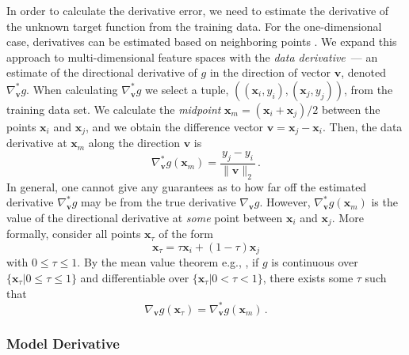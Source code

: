 \documentclass[conference]{IEEEtran}
\begin{document}
In order to calculate the derivative error, we need to estimate the derivative of the unknown target function from the training data. 
For the one-dimensional case, derivatives can be estimated based on neighboring points \cite{kis2021numerical}.
We expand this approach to multi-dimensional feature spaces with the \emph{data derivative}~--- an estimate of the directional derivative of $g$ in the direction of vector $\mathbf{v}$, denoted $\nabla^{*}_{\mathbf{v}}g$. 
When calculating $\nabla^{*}_{\mathbf{v}}g$ we select a tuple, $((\mathbf{x}_i,y_i),(\mathbf{x}_j,y_j))$, from the training data set.
We calculate the \emph{midpoint} $\mathbf{x}_m = (\mathbf{x}_i+\mathbf{x}_j)/2$ between the points $\mathbf{x}_i$ and $\mathbf{x}_j$, and we obtain the difference vector $\mathbf{v} = \mathbf{x}_j - \mathbf{x}_i$.
Then, the data derivative at $\mathbf{x}_m$ along the direction $\mathbf{v}$ is
\begin{equation} 
\nabla^{*}_{\mathbf{v}}g(\mathbf{x}_m) = \frac{y_j - y_i}{\|\mathbf{v}\|_2}\,.
\end{equation}
In general, one cannot give any guarantees as to how far off the estimated derivative $\nabla^{*}_{\mathbf{v}}g$ may be from the true derivative $\nabla_{\mathbf{v}}g$. 
However, $\nabla^{*}_{\mathbf{v}}g(\mathbf{x}_m)$ is the value of the directional derivative at \emph{some} point between $\mathbf{x}_{i}$ and $\mathbf{x}_{j}$. More formally, consider all points $\mathbf{x}_{\tau}$ of the form 
\begin{equation}
 \mathbf{x}_{\tau} = \tau \mathbf{x}_{i} + (1-\tau)\mathbf{x}_{j}
\end{equation} 
with $0\leq\tau\leq1$.
By the mean value theorem e.g., \cite{rodhe-et-al-2012-introduction}, if $g$ is continuous over $\{\mathbf{x}_{\tau}|0\leq\tau\leq1\}$ and differentiable over $\{\mathbf{x}_{\tau}|0<\tau<1\}$, there exists some $\tau$ such that 
\begin{equation}
 \nabla_{\mathbf{v}}g(\mathbf{x}_{\tau}) = \nabla^{*}_{\mathbf{v}}g(\mathbf{x}_m)\,.
\end{equation}



\subsubsection{Model Derivative}
\end{document}

